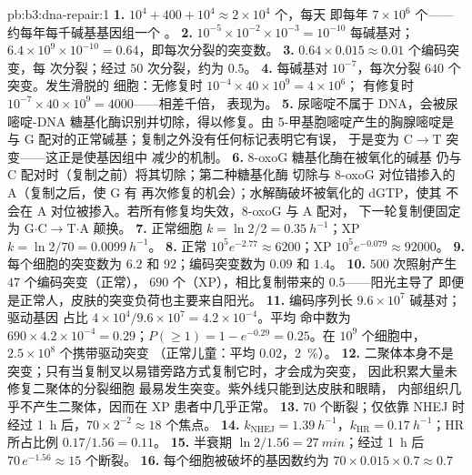 \begin{solution}{pb:b3:dna-repair:1}
\textbf{1.} $10^{4} + 400 + 10^{4} \approx 2\times 10^{4}$ 个，每天
即每年 $7\times 10^{6}$ 个——约每年每千碱基基因组一个
。
\textbf{2.} $10^{-5}\times 10^{-2}\times 10^{-3} = 10^{-10}$ 每碱基对；
$6.4\times 10^{9}\times 10^{-10} = 0.64$，即每次分裂的突变数。
\textbf{3.} $0.64\times 0.015 \approx 0.01$ 个编码突变，每
次分裂；经过 $50$ 次分裂，约为 $0.5$。
\textbf{4.} 每碱基对 $10^{-7}$，每次分裂 $640$ 个突变。发生滑脱的
细胞：无修复时 $10^{-4}\times 40\times 10^{9} = 4\times 10^{6}$；
有修复时 $10^{-7}\times 40\times 10^{9} = 4000$——相差千倍，
表现为。
\textbf{5.} 尿嘧啶不属于 DNA，会被尿嘧啶-DNA
糖基化酶识别并切除，得以修复。由 5-甲基胞嘧啶产生的胸腺嘧啶是
与 G 配对的正常碱基；复制之外没有任何标记表明它有误，
于是变为 C$\to$T 突变——这正是使基因组中
 减少的机制。
\textbf{6.} 8-oxoG 糖基化酶在被氧化的碱基
仍与 C 配对时（复制之前）将其切除；第二种糖基化酶
切除与 8-oxoG 对位错掺入的 A（复制之后，使 G 有
再次修复的机会）；水解酶破坏被氧化的 dGTP，使其
不会在 A 对位被掺入。若所有修复均失效，8-oxoG 与 A 配对，
下一轮复制便固定为 G$\cdot$C$\to$T$\cdot$A 颠换。
\textbf{7.} 正常细胞 $k = \ln 2/2 = \qty{0.35}{h^{-1}}$；XP $k = \ln 2/70
= \qty{0.0099}{h^{-1}}$。
\textbf{8.} 正常 $10^{5} e^{-2.77} \approx 6200$；XP $10^{5}
e^{-0.079} \approx \num{92000}$。
\textbf{9.} 每个细胞的突变数为 $6.2$ 和 $92$；编码突变数为 $0.09$ 和 $1.4$。
\textbf{10.} $500$ 次照射产生 $47$ 个编码突变（正常），
$690$ 个（XP），相比复制带来的 $0.5$——阳光主导了
即便是正常人，皮肤的突变负荷也主要来自阳光。
\textbf{11.} 编码序列长 $9.6\times 10^{7}$ 碱基对；驱动基因
占比 $4\times 10^{4}/9.6\times 10^{7} = 4.2\times 10^{-4}$。平均
命中数为 $690\times 4.2\times 10^{-4} = 0.29$；$P(\ge 1) = 1 - e^{-0.29} =
0.25$。在 $10^{9}$ 个细胞中，$2.5\times 10^{8}$ 个携带驱动突变
（正常儿童：平均 $0.02$，\qty{2}{\%}）。
\textbf{12.} 二聚体本身不是突变；只有当复制叉以易错旁路方式复制它时，才会成为突变，
因此积累大量未修复二聚体的分裂细胞
最易发生突变。紫外线只能到达皮肤和眼睛，
内部组织几乎不产生二聚体，因而在
XP 患者中几乎正常。
\textbf{13.} $70$ 个断裂；仅依靠 NHEJ 时经过 \qty{1}{h} 后，$70\times
2^{-2} \approx 18$ 个焦点。
\textbf{14.} $k_{\text{NHEJ}} = \qty{1.39}{h^{-1}}$，$k_{\text{HR}} =
\qty{0.17}{h^{-1}}$；HR 所占比例 $0.17/1.56 = 0.11$。
\textbf{15.} 半衰期 $\ln 2/1.56 = \qty{27}{min}$；经过 \qty{1}{h} 后
$70\,e^{-1.56} \approx 15$ 个断裂。
\textbf{16.} 每个细胞被破坏的基因数约为 $70\times 0.015\times 0.7 \approx 0.7$

\end{solution}
